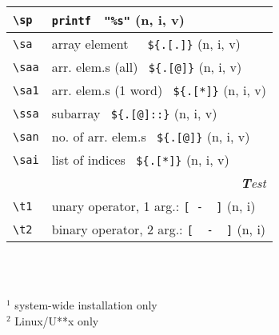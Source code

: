 \documentclass[oneside,11pt,a4paper,DIV18]{scrartcl}
\begin{document}
\begin{center}
\begin{tabular}[]{|p{11mm}|p{59mm}|}
\hline \verb'\sp'  & \verb'printf  "%s"'                   \hfill (n, i, v)\\
\hline \verb'\sa'  & array element\ \ \ \verb'${.[.]}'     \hfill (n, i, v)\\
\hline \verb'\saa' & arr. elem.s (all) \ \verb'${.[@]}'    \hfill (n, i, v)\\
\hline \verb'\sa1' & arr. elem.s (1 word) \ \verb'${.[*]}' \hfill (n, i, v)\\
\hline \verb'\ssa' & subarray \ \verb'${.[@]::}'           \hfill (n, i, v)\\
\hline \verb'\san' & no. of arr. elem.s \ \verb'${.[@]}'   \hfill (n, i, v)\\
\hline \verb'\sai' & list of indices \ \verb'${.[*]}'      \hfill (n, i, v)\\
\hline
\hline
\multicolumn{2}{|r|}{\textsl{\textbf{T}est}}\\
\hline \verb'\t1'  &  unary operator, 1 arg.: \verb'[ -  ]'         \hfill (n, i)\\
\hline \verb'\t2'  &  binary operator, 2 arg.: \verb'[  -  ]'        \hfill (n, i)\\
\hline
\end{tabular}\\
%
\begin{minipage}[b]{75mm}%
\scriptsize{%
\vspace{10mm}
\hrulefill\\
$^1$ {system-wide installation only}\\
$^2$ {Linux/U**x only}
}%
\end{minipage}\\
%


\end{center}
\end{document}
